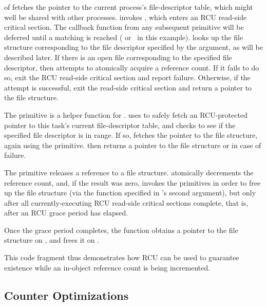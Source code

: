 \begin{fcvref}
 of  fetches the pointer to the current
process's file-descriptor table, which might well be shared
with other processes.
 invokes , which
enters an RCU read-side critical section.
The callback function from any subsequent  primitive
will be deferred until a matching  is reached
( or~ in this example).
 looks up the file structure corresponding to the file
descriptor specified by the  argument, as will be
described later.
If there is an open file corresponding to the specified file descriptor,
then  attempts to atomically acquire a reference count.
If it fails to do so,  exit the RCU read-side critical
section and report failure.
Otherwise, if the attempt is successful, 
exit the read-side
critical section and return a pointer to the file structure.

The  primitive is a helper function for
.
 uses  to safely fetch an
RCU-protected pointer to this task's current file-descriptor table,
and  checks to see if the specified file descriptor is in range.
If so,  fetches the pointer to the file structure, again using
the  primitive.
 then returns a pointer to the file structure or 
in case of failure.

The  primitive releases a reference to a file structure.
 atomically decrements the reference count, and, if the
result was zero,  invokes the  primitives
in order to free up the file structure (via the 
function specified in 's second argument), but only after
all currently-executing RCU read-side critical sections complete, that
is, after an RCU grace period has elapsed.

Once the grace period completes, the  function
obtains a pointer to the file structure on , and frees it
on .
\end{fcvref}

This code fragment thus demonstrates how RCU can be used to guarantee
existence while an in-object reference count is being incremented.

\subsection{Counter Optimizations}
\label{sec:together:Counter Optimizations}

